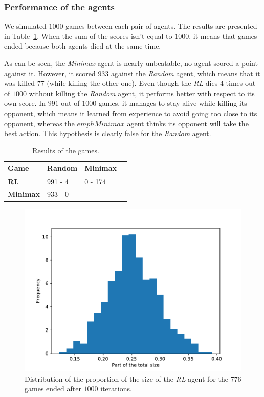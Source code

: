 \documentclass[journal, a4paper]{IEEEtran}
\begin{document}
\subsubsection{Performance of the agents}

We simulated $1000$ games between each pair of agents.
The results are presented in Table~\ref{comparative_table}.
When the sum of the scores isn't equal to $1000$, it means that games ended because both agents died at the same time.

As can be seen, the \emph{Minimax} agent is nearly unbeatable, no agent scored a point against it.
However, it scored $933$ against the \emph{Random} agent, which means that it was killed $77$ (while killing the other one).
Even though the \emph{RL} dies $4$ times out of $1000$ without killing the \emph{Random} agent, it performs better with respect to its own score.
In $991$ out of $1000$ games, it manages to stay alive while killing its opponent, which means it learned from experience to avoid going too close to its opponent, whereas the $emph{Minimax}$ agent thinks its opponent will take the best action.
This hypothesis is clearly false for the \emph{Random} agent.

\begin{table}[h]
	\caption{\label{comparative_table}Results of the games.}
	\centering
	\begin{tabular}{llll}
		\hline
        \textbf{Game} & \textbf{Random} & \textbf{Minimax}  \\
		\hline
        \textbf{RL} & 991 - 4 & 0 - 174 \\
        \textbf{Minimax} & 933 - 0 &  \\
		\hline
	\end{tabular}
\end{table}

\begin{figure}[h]
	\centering
    \includegraphics[width=0.95\columnwidth]{images/histo_size.pdf}
    \caption{\label{histo_size}Distribution of the proportion of the size of the \emph{RL} agent for the $776$ games ended after $1000$ iterations.}
\end{figure}
\end{document}
